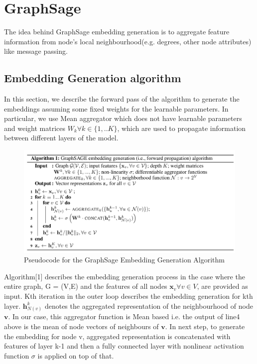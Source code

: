 \documentclass[review]{elsarticle}
\begin{document}
\section{GraphSage}
\noindent The idea behind GraphSage\cite{graphsage_paper} embedding generation is to aggregate feature information from node's local neighbourhood(e.g. degrees, other node attributes) like message passing.
\subsection{Embedding Generation algorithm}
In this section, we describe the forward pass of the algorithm to generate the embeddings assuming some fixed weights for the learnable parameters. In particular, we use Mean aggregator which does not have learnable parameters and weight matrices $W_{k} \forall k \in \{1,..K\}$, which are used to propagate information between different layers of the model.
\vspace{-1.4in}
\begin{figure}[h]
    \centering
    	\includegraphics[width=1.\textwidth]{Gsage.png}
    	\caption{Pseudocode for the GraphSage Embedding Generation Algorithm}
	    \label{fig:graphsage_pseudo}
\end{figure}
Algorithm[1] describes the embedding generation process in the case where the entire graph, G = (V,E) and the features of all nodes $\mathbf{x}_{v} \forall v \in V$, are provided as input. Kth iteration in the outer loop describes the embedding generation for kth layer. $\mathbf{h}_{N(v)}^{k}$ denotes the aggregated representation of the neighbourhood of node $\mathbf{v}$. In our case, this aggregator function is Mean based i.e. the output of line4 above is the mean of node vectors of neighbours of $\mathbf{v}$. In next step, to generate the embedding for node v, aggregated representation is concatenated with features of layer k-1 and then a fully connected layer with nonlinear activation function $\sigma$ is applied on top of that.
\end{document}
